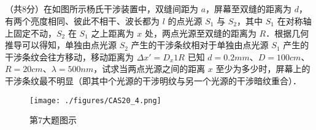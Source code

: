 \subsection{ }
（共8分）在如图所示杨氏干涉装置中，双缝间距为 $a$，屏幕至双缝的距离为 $d$，有两个亮度相同、彼此不相干、波长都为 $l$ 的点光源 $S_1$ 与 $S_2$，其中 $S_1$ 在对称轴上固定不动，$S_2$ 在 $S_1$ 之上距离为 $x$ 处，两点光源至双缝的距离为 $R$．根据几何推导可以得知，单独由点光源 $S_2$ 产生的干涉条纹相对于单独由点光源 $S_1$ 产生的干涉条纹会往方移动，移动距离为 $\Delta x'=D_{x}1R$ 已知 $d=0.2mm$、$D=100cm$、$R=20cm$、$\lambda =500nm$，试求当两点光源之间的距离 $x$ 至少为多少时，屏幕上的干涉条纹最不明显（即其中个光源的干涉明纹与另一个光源的干涉暗纹重合）．\\
\begin{figure}[ht]
\centering
\texttt{[image: ./figures/CAS20\_4.png]}
\caption{第7大题图示} \label{CAS20_fig4}
\end{figure}